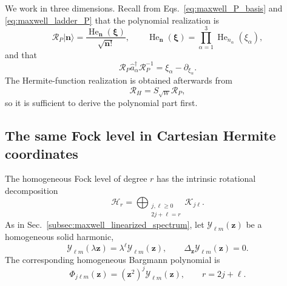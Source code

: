 \documentclass[11pt,oneside]{article}
\numberwithin{equation}{section}
\theoremstyle{definition}
\begin{document}
We work in three dimensions.  Recall from
Eqs.~\eqref{eq:maxwell_P_basis} and \eqref{eq:maxwell_ladder_P} that the
polynomial realization is
\begin{equation}
\mathcal R_P|\bm n\rangle
=
\frac{\operatorname{He}_{\bm n}(\bm\xi)}
{\sqrt{\bm n!}},
\qquad
\operatorname{He}_{\bm n}(\bm\xi)
=
\prod_{\alpha=1}^{3}
\operatorname{He}_{n_\alpha}(\xi_\alpha),
\label{eq:app_maxwell_RP_cartesian}
\end{equation}
and that
\begin{equation}
\mathcal R_P\hat a_\alpha^\dagger \mathcal R_P^{-1}
=
\xi_\alpha-\partial_{\xi_\alpha}.
\label{eq:app_maxwell_RP_creation}
\end{equation}
The Hermite-function realization is obtained afterwards from
\begin{equation}
\mathcal R_H=S_{\sqrt W}\mathcal R_P,
\label{eq:app_maxwell_RH_from_RP}
\end{equation}
so it is sufficient to derive the polynomial part first.

\subsection{The same Fock level in Cartesian Hermite coordinates}

The homogeneous Fock level of degree $r$ has the intrinsic rotational
decomposition
\begin{equation}
\mathscr H_r
=
\bigoplus_{\substack{j,\ell\geq0\\2j+\ell=r}}
\mathscr K_{j\ell}.
\end{equation}
As in Sec.~\ref{subsec:maxwell_linearized_spectrum}, let
$\mathcal Y_{\ell m}(\bm z)$ be a homogeneous solid harmonic,
\begin{equation}
\mathcal Y_{\ell m}(\lambda\bm z)
=
\lambda^\ell\mathcal Y_{\ell m}(\bm z),
\qquad
\Delta_{\bm z}\mathcal Y_{\ell m}(\bm z)=0.
\label{eq:app_maxwell_solid_harmonic}
\end{equation}
The corresponding homogeneous Bargmann polynomial is
\begin{equation}
\Phi_{j\ell m}(\bm z)
=
(\bm z^2)^j\mathcal Y_{\ell m}(\bm z),
\qquad
r=2j+\ell.
\label{eq:app_maxwell_Phi_jlm}
\end{equation}
\end{document}
